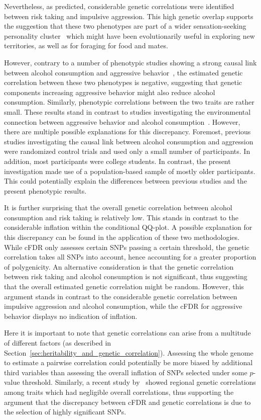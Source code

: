Nevertheless, as predicted, considerable genetic correlations were identified between risk taking and impulsive aggression.
This high genetic overlap supports the suggestion that these two phenotypes are part of a wider sensation-seeking personality cluster~\cite{Zuckerman2000} which might have been evolutionarily useful in exploring new territories, as well as for foraging for food and mates.

However, contrary to a number of phenotypic studies showing a strong causal link between alcohol consumption and aggressive behavior~\cite{FRANZKOWIAX1987,Zuckerman2000,Dakwar2011}, the estimated genetic correlation between these two phenotypes is negative, suggesting that genetic components increasing aggressive behavior might also reduce alcohol consumption.
Similarly, phenotypic correlations between the two traits are rather small.
These results stand in contrast to studies investigating the environmental connection between aggressive behavior and alcohol consumption~\cite{Bushman1990}.
However, there are multiple possible explanations for this discrepancy.
Foremost, previous studies investigating the causal link between alcohol consumption and aggression were randomized control trials and used only a small number of participants.
In addition, most participants were college students.
In contrast, the present investigation made use of a population-based sample of mostly older participants.
This could potentially explain the differences between previous studies and the  present phenotypic results.

It is further surprising that the overall genetic correlation between alcohol consumption and risk taking is relatively low.
This stands in contrast to the considerable inflation within the conditional QQ-plot.
A possible explanation for this discrepancy can be found in the application of these two methodologies.
While cFDR only assesses certain SNPs passing a certain threshold, the genetic correlation takes all SNPs into account, hence accounting for a greater proportion of polygenicity.
An alternative consideration is that the genetic correlation between risk taking and alcohol consumption is not significant, thus suggesting that the overall estimated genetic correlation might be random.
However, this argument stands in contrast to the considerable genetic correlation between impulsive aggression and alcohol consumption, while the cFDR for aggressive behavior displays no indication of  inflation.

Here it is important to note that genetic correlations can arise from a multitude of different factors (as described in Section~\ref{sec:heritability_and_genetic_correlation}).
Assessing the whole genome to estimate a pairwise correlation could potentially be more biased by additional third variables than assessing the overall inflation of SNPs selected under some $p$-value threshold.
Similarly, a recent study by~\citet{Shi2016a} showed regional genetic correlations among traits which had negligible overall correlations,
thus supporting the argument that the discrepancy between cFDR and genetic correlations is due to the selection of highly significant SNPs.

